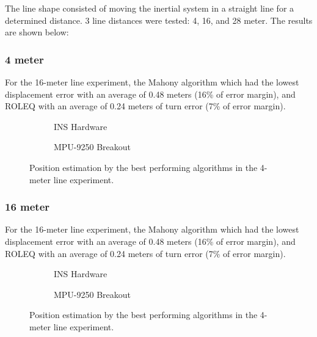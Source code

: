 The line shape consisted of moving the inertial system in a straight line for a determined distance. 3 line distances were tested: 4, 16, and 28 meter. The results are shown below:

\subsubsection{4 meter}

For the 16-meter line experiment, the Mahony algorithm which had the lowest displacement error with an average of 0.48 meters (16\% of error margin), and ROLEQ with an average of 0.24 meters of turn error (7\% of error margin).


\begin{figure}[!h]
    \centering
    
\end{figure}

\begin{figure}[!h]
    \centering
    \begin{subfigure}{0.49\textwidth}
        \centering
        \resizebox{1\linewidth}{!}{}
        \caption{INS Hardware}
        \label{fig:square42D}
    \end{subfigure}
    \begin{subfigure}{0.49\textwidth}
        \centering
        \resizebox{1\linewidth}{!}{}
        \caption{MPU-9250 Breakout}
        \label{fig:square43D}
    \end{subfigure}
    \caption{Position estimation by the best performing algorithms in the 4-meter line experiment.}
    \label{fig:square4}
\end{figure}

\subsubsection{16 meter}

For the 16-meter line experiment, the Mahony algorithm which had the lowest displacement error with an average of 0.48 meters (16\% of error margin), and ROLEQ with an average of 0.24 meters of turn error (7\% of error margin).

\begin{figure}[!h]
    \centering
    
\end{figure}

\begin{figure}[!h]
    \centering
    \begin{subfigure}{0.49\textwidth}
        \centering
        \resizebox{1\linewidth}{!}{}
        \caption{INS Hardware}
        \label{fig:square162D}
    \end{subfigure}
    \begin{subfigure}{0.49\textwidth}
        \centering
        \resizebox{1\linewidth}{!}{}
        \caption{MPU-9250 Breakout}
        \label{fig:square163D}
    \end{subfigure}
    \caption{Position estimation by the best performing algorithms in the 4-meter line experiment.}
    \label{fig:square16}
\end{figure}

